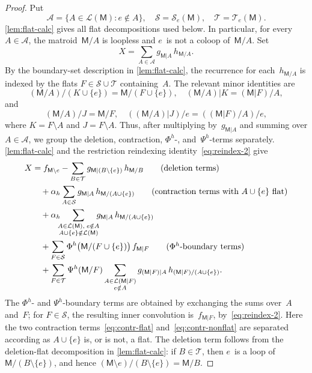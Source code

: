 \documentclass[12pt,letterpaper,english]{amsart}
\theoremstyle{teoremas}
\theoremstyle{definition}
\newcommand{\M}{\mathsf{M}}
\newcommand{\Se}{\mathcal{S}_e}
\newcommand{\Te}{\mathcal{T}_e}
\begin{document}
\begin{proof}
Put
\[
\mathcal{A} = \{A \in \mathcal{L}(\M) : e \notin A\},\quad
\mathcal{S} = \Se(\M),\quad
\mathcal{T} = \Te(\M).
\]
\cref{lem:flat-calc} gives all flat decompositions used below.
In particular, for every $A \in \mathcal{A}$, the matroid~$\M/A$ is
loopless and $e$~is not a coloop of~$\M/A$.  Set
\[
X = \sum_{A \in \mathcal{A}} g_{\M|A}\, h_{\M/A}.
\]
By the boundary-set description in \cref{lem:flat-calc}, the recurrence
for each~$h_{\M/A}$ is indexed by the flats $F \in \mathcal{S} \cup \mathcal{T}$
containing~$A$.  The relevant minor identities are
\[
(\M/A)/(K \cup \{e\}) = \M/(F \cup \{e\}),\quad
(\M/A)|K = (\M|F)/A,
\]
and
\[
(\M/A)/J = \M/F,\quad
((\M/A)|J)/e = ((\M|F)/A)/e,
\]
where $K = F \setminus A$ and $J = F \setminus A$.
Thus, after multiplying by~$g_{\M|A}$ and summing over $A \in \mathcal{A}$,
we group the deletion, contraction, $\Phi^h$-, and~$\Psi^h$-terms separately.
\cref{lem:flat-calc} and the restriction reindexing
identity~\eqref{eq:reindex-2} give
\begin{align}
X &= f_{\M \setminus e}
  - \sum_{B \in \mathcal{T}} g_{\M|(B \setminus \{e\})}\, h_{\M/B}
  \tag{deletion terms} \label{eq:del-terms} \\
&\quad + \alpha_h \sum_{A \in \mathcal{S}}
  g_{\M|A}\, h_{\M/(A \cup \{e\})}
  \tag{contraction terms with $A \cup \{e\}$ flat}
  \label{eq:contr-flat} \\
&\quad + \alpha_h \!\!\!\sum_{\substack{A \in \mathcal{L}(\M),\;
  e \notin A \\ A \cup \{e\} \notin \mathcal{L}(\M)}} \!\!\!
  g_{\M|A}\, h_{\M/(A \cup \{e\})}
  \label{eq:contr-nonflat} \\
&\quad + \sum_{F \in \mathcal{S}}
  \Phi^h\bigl(\M/(F \cup \{e\})\bigr)\, f_{\M|F}
  \tag{$\Phi^h$-boundary terms}
  \label{eq:Phih-terms} \\
&\quad + \sum_{F \in \mathcal{T}} \Psi^h(\M/F)
  \sum_{\substack{A \in \mathcal{L}(\M|F) \\ e \notin A}}
  g_{(\M|F)|A}\, h_{(\M|F)/(A \cup \{e\})}.
  \label{eq:Psih-terms}
\end{align}
The $\Phi^h$- and $\Psi^h$-boundary terms are obtained by exchanging the
sums over~$A$ and~$F$; for $F \in \mathcal{S}$, the resulting inner
convolution is~$f_{\M|F}$, by~\eqref{eq:reindex-2}.
Here the two contraction terms~\eqref{eq:contr-flat}
and~\eqref{eq:contr-nonflat} are separated according as $A \cup \{e\}$
is, or is not, a flat.  The deletion term follows from the deletion-flat
decomposition in \cref{lem:flat-calc}: if $B \in \mathcal{T}$, then $e$~is
a loop of~$\M/(B \setminus \{e\})$, and hence
$(\M \setminus e)/(B \setminus \{e\}) = \M/B$.


\end{proof}
\end{document}

